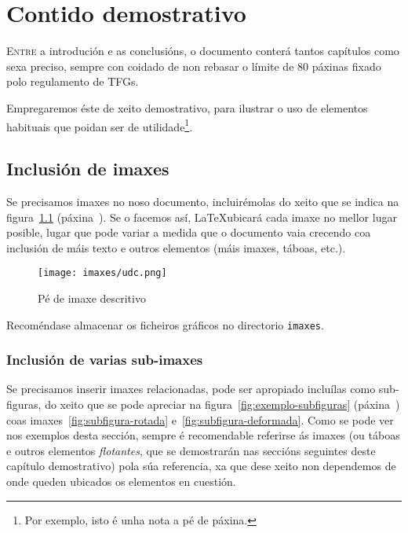 %

\chapter{Contido demostrativo}
\label{chap:demo}

\lettrine{E}{ntre} a introdución e as conclusións, o documento conterá
tantos capítulos como sexa preciso, sempre con coidado de non rebasar
o límite de 80 páxinas fixado polo regulamento de TFGs.

Empregaremos éste de xeito demostrativo, para ilustrar o uso de
elementos habituais que poidan ser de utilidade\footnote{Por exemplo,
  isto é unha nota a pé de páxina.}.

\section{Inclusión de imaxes}

Se precisamos imaxes no noso documento, incluirémolas do xeito que se
indica na figura~\ref{fig:exemplo} (páxina~\pageref{fig:exemplo}). Se
o facemos así, \LaTeX ubicará cada imaxe no mellor lugar posible,
lugar que pode variar a medida que o documento vaia crecendo coa
inclusión de máis texto e outros elementos (máis imaxes, táboas,
etc.).

\begin{figure}[hp!]
  \centering
  \texttt{[image: imaxes/udc.png]}
  \caption{Pé de imaxe descritivo}
  \label{fig:exemplo}
\end{figure}

Recoméndase almacenar os ficheiros gráficos no directorio
\texttt{imaxes}.

\subsection{Inclusión de varias sub-imaxes}

Se precisamos inserir imaxes relacionadas, pode ser apropiado
incluílas como sub-figuras, do xeito que se pode apreciar na
figura~\ref{fig:exemplo-subfiguras} (páxina~\pageref{fig:exemplo-subfiguras})
coas imaxes~\ref{fig:subfigura-rotada} e~\ref{fig:subfigura-deformada}.
Como se pode ver nos exemplos desta sección, sempre é recomendable
referirse ás imaxes (ou táboas e outros elementos \emph{flotantes},
que se demostrarán nas seccións seguintes deste capítulo demostrativo)
pola súa referencia, xa que dese xeito non dependemos de onde
queden ubicados os elementos en cuestión.


